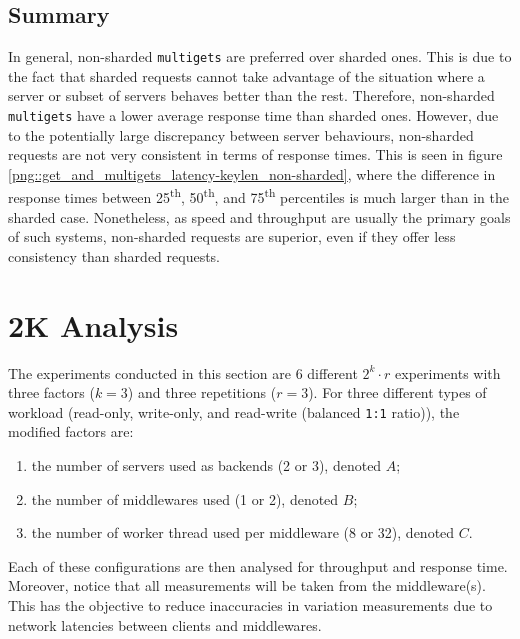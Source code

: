 \documentclass[11pt,a4paper]{article}
\begin{document}
\subsection{Summary}
In general, non-sharded \texttt{multigets} are preferred over sharded ones. This is due to the fact that sharded requests cannot take advantage of the situation where a server or subset of servers behaves better than the rest. Therefore, non-sharded \texttt{multigets} have a lower average response time than sharded ones. However, due to the potentially large discrepancy between server behaviours, non-sharded requests are not very consistent in terms of response times. This is seen in figure \ref{png::get_and_multigets_latency-keylen_non-sharded}, where the difference in response times between 25\textsuperscript{th}, 50\textsuperscript{th}, and 75\textsuperscript{th} percentiles is much larger than in the sharded case. Nonetheless, as speed and throughput are usually the primary goals of such systems, non-sharded requests are superior, even if they offer less consistency than sharded requests.



\newpage

\section{2K Analysis}
The experiments conducted in this section are 6 different $2^k\cdot r$ experiments with three factors ($k = 3$) and three repetitions ($r = 3$). For three different types of workload (read-only, write-only, and read-write (balanced \texttt{1:1} ratio)), the modified factors are:
\begin{enumerate}
    \item the number of servers used as backends (2 or 3), denoted $A$;
    \item the number of middlewares used (1 or 2), denoted $B$;
    \item the number of worker thread used per middleware (8 or 32), denoted $C$.
\end{enumerate}
Each of these configurations are then analysed for throughput and response time. Moreover, notice that all measurements will be taken from the middleware(s). This has the objective to reduce inaccuracies in variation measurements due to network latencies between clients and middlewares.
\end{document}
